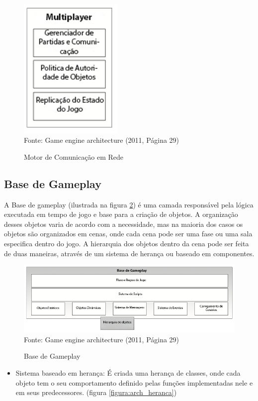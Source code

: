 \documentclass[12pt,	openright, twoside,	a4paper, english, french, spanish, brazil]{abntex2}
\begin{document}
\begin{figure}[H]
\centering
\caption{Motor de Comunicação em Rede}
\includegraphics[width=5cm]{imagens/arch-network.png}
\\
\small{Fonte: Game engine architecture (2011, Página 29)}
\label{figura:arch_network}
\end{figure}

\subsection{Base de Gameplay}
A Base de gameplay (ilustrada na figura \ref{figura:arch_gameplay}) é uma camada responsável pela lógica executada em tempo de jogo e base para a criação de objetos. A organização desses objetos varia de acordo com a necessidade, mas na maioria dos casos os objetos são organizados em cenas, onde cada cena pode ser uma fase ou uma sala especifica dentro do jogo. A hierarquia dos objetos dentro da cena pode ser feita de duas maneiras, através de um sistema de herança ou baseado em componentes.

\begin{figure}[H]
\centering
\caption{Base de Gameplay}
\includegraphics[width=17cm]{imagens/arch-gameplay.png}
\\
\small{Fonte: Game engine architecture (2011, Página 29)}
\label{figura:arch_gameplay}
\end{figure}

\begin{itemize}
\item Sistema baseado em herança: É criada uma herança de classes, onde cada objeto tem o seu comportamento definido pelas funções implementadas nele e em seus predecessores. (figura \ref{figura:arch_heranca})
\end{itemize}
\end{document}
